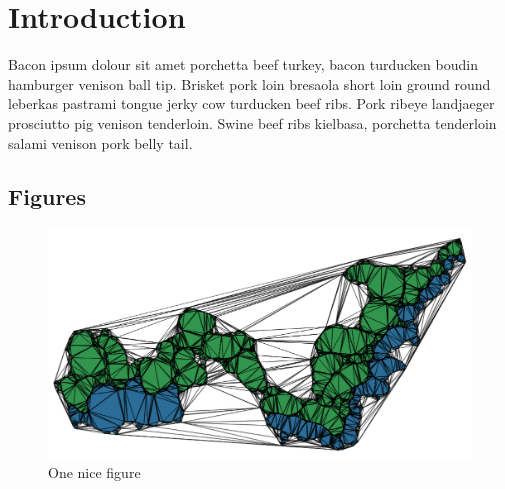 
\chapter{Introduction}
\label{sec:introduction}

Bacon ipsum dolour sit amet porchetta beef turkey, bacon turducken boudin hamburger venison ball tip. Brisket pork loin bresaola short loin ground round leberkas pastrami tongue jerky cow turducken beef ribs. Pork ribeye landjaeger prosciutto pig venison tenderloin. Swine beef ribs kielbasa, porchetta tenderloin salami venison pork belly tail.

\section{Figures}

\begin{figure}
  \centering
  \includegraphics[width=0.8\linewidth]{figs/sometriangles.png}
  \caption{One nice figure}
\label{fig:sometriangles}
\end{figure}

